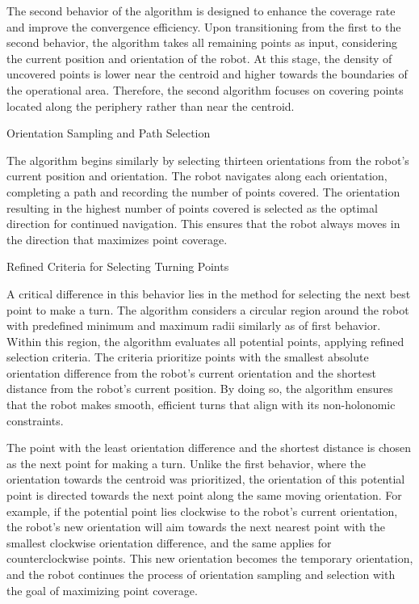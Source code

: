 The second behavior of the algorithm is designed to enhance the coverage rate and improve the convergence efficiency. Upon transitioning from the first to the second behavior, the algorithm takes all remaining points as input, considering the current position and orientation of the robot. At this stage, the density of uncovered points is lower near the centroid and higher towards the boundaries of the operational area. Therefore, the second algorithm focuses on covering points located along the periphery rather than near the centroid.

\vspace*{6mm}   

Orientation Sampling and Path Selection

The algorithm begins similarly by selecting thirteen orientations from the robot's current position and orientation. The robot navigates along each orientation, completing a path and recording the number of points covered. The orientation resulting in the highest number of points covered is selected as the optimal direction for continued navigation. This ensures that the robot always moves in the direction that maximizes point coverage.

\vspace*{6mm}   

Refined Criteria for Selecting Turning Points

A critical difference in this behavior lies in the method for selecting the next best point to make a turn. The algorithm considers a circular region around the robot with predefined minimum and maximum radii similarly as of first behavior. Within this region, the algorithm evaluates all potential points, applying refined selection criteria. The criteria prioritize points with the smallest absolute orientation difference from the robot's current orientation and the shortest distance from the robot's current position. By doing so, the algorithm ensures that the robot makes smooth, efficient turns that align with its non-holonomic constraints.

\vspace*{6mm}   

The point with the least orientation difference and the shortest distance is chosen as the next point for making a turn. Unlike the first behavior, where the orientation towards the centroid was prioritized, the orientation of this potential point is directed towards the next point along the same moving orientation. For example, if the potential point lies clockwise to the robot's current orientation, the robot's new orientation will aim towards the next nearest point with the smallest clockwise orientation difference, and the same applies for counterclockwise points. This new orientation becomes the temporary orientation, and the robot continues the process of orientation sampling and selection with the goal of maximizing point coverage.

